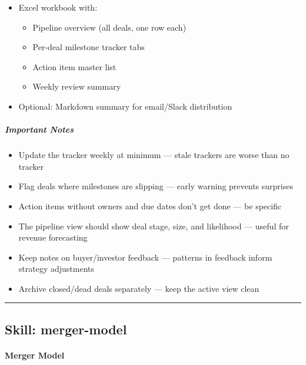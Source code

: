 \documentclass[11pt]{article}
\begin{document}
\begin{itemize}[leftmargin=*,itemsep=2pt,topsep=2pt]
\item {} Excel workbook with:
\begin{itemize}[leftmargin=*,itemsep=2pt,topsep=2pt]
\item {} Pipeline overview (all deals, one row each)
\item {} Per-deal milestone tracker tabs
\item {} Action item master list
\item {} Weekly review summary
\end{itemize}
\item {} Optional: Markdown summary for email/Slack distribution
\end{itemize}

\subparagraph{Important Notes}\mbox{}\par

\begin{itemize}[leftmargin=*,itemsep=2pt,topsep=2pt]
\item {} Update the tracker weekly at minimum — stale trackers are worse than no tracker
\item {} Flag deals where milestones are slipping — early warning prevents surprises
\item {} Action items without owners and due dates don't get done — be specific
\item {} The pipeline view should show deal stage, size, and likelihood — useful for revenue forecasting
\item {} Keep notes on buyer/investor feedback — patterns in feedback inform strategy adjustments
\item {} Archive closed/dead deals separately — keep the active view clean
\end{itemize}

\vspace{0.8em}\hrule\vspace{0.8em}

\subsection{Skill: merger-model}\label{file:skills-merger-model-SKILL.md}

\paragraph{Merger Model}\mbox{}\par
\end{document}
